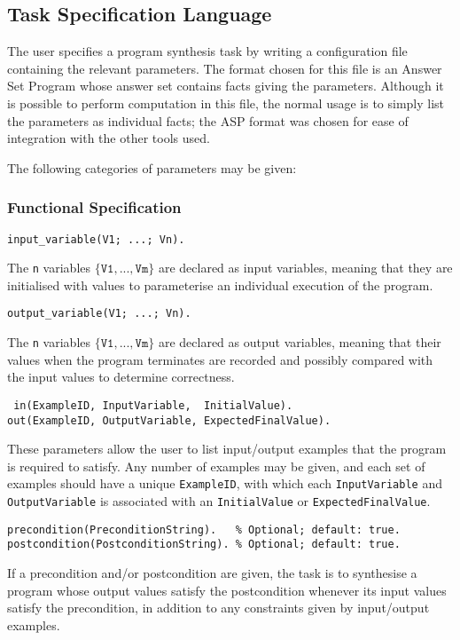 \documentclass[a4paper,twoside,notitlepage]{article}
\newcommand{\ttt}{\texttt}
\begin{document}
\subsection{Task Specification Language} \label{sec:spclng}

The user specifies a program synthesis task by writing a configuration file 
containing the relevant parameters. The format chosen for this file is an 
Answer Set Program whose answer set contains facts giving the parameters. 
Although it is possible to perform computation in this file, the normal usage 
is to simply list the parameters as individual facts; the ASP format was 
chosen for ease of integration with the other tools used.

The following categories of parameters may be given:

\subsubsection{Functional Specification}

\begin{verbatim}
input_variable(V1; ...; Vn).
\end{verbatim}
The \ttt{n} variables $\{\ttt{V1}, ..., \ttt{Vm}\}$ are declared as input 
variables, meaning that they are initialised with values to parameterise an 
individual execution of the program.

\begin{verbatim}
output_variable(V1; ...; Vn).
\end{verbatim}
The \ttt{n} variables $\{\ttt{V1}, ..., \ttt{Vm}\}$ are declared as output
variables, meaning that their values when the program terminates are recorded
and possibly compared with the input values to determine correctness.

\begin{verbatim}
 in(ExampleID, InputVariable,  InitialValue).
out(ExampleID, OutputVariable, ExpectedFinalValue).
\end{verbatim}
These parameters allow the user to list input/output examples that the program 
is required to satisfy. Any number of examples may be given, and each set of 
examples should have a unique \ttt{ExampleID}, with which each 
\ttt{InputVariable} and \ttt{OutputVariable} is associated with an 
\ttt{InitialValue} or \ttt{ExpectedFinalValue}.

\begin{verbatim}
precondition(PreconditionString).   % Optional; default: true.
postcondition(PostconditionString). % Optional; default: true.
\end{verbatim}
If a precondition and/or postcondition are given, the task is to synthesise a 
program whose output values satisfy the postcondition whenever its input 
values satisfy the precondition, in addition to any constraints given by 
input/output examples.
\end{document}
